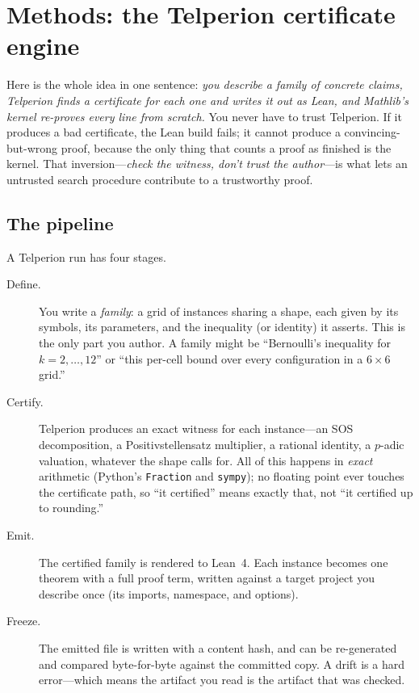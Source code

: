 \section{Methods: the Telperion certificate engine}
\label{sec:system}

Here is the whole idea in one sentence: \emph{you describe a family of concrete
claims, Telperion finds a certificate for each one and writes it out as Lean, and
Mathlib's kernel re-proves every line from scratch.} You never have to trust
Telperion. If it produces a bad certificate, the Lean build fails; it cannot
produce a convincing-but-wrong proof, because the only thing that counts a proof
as finished is the kernel. That inversion---\emph{check the witness, don't trust
the author}---is what lets an untrusted search procedure contribute to a
trustworthy proof.

\subsection{The pipeline}

A Telperion run has four stages.

\begin{description}
  \item[Define.] You write a \emph{family}: a grid of instances sharing a shape,
    each given by its symbols, its parameters, and the inequality (or identity)
    it asserts. This is the only part you author. A family might be ``Bernoulli's
    inequality for $k = 2, \dots, 12$'' or ``this per-cell bound over every
    configuration in a $6 \times 6$ grid.''
  \item[Certify.] Telperion produces an exact witness for each instance---an SOS
    decomposition, a Positivstellensatz multiplier, a rational identity, a
    $p$-adic valuation, whatever the shape calls for. All of this happens in
    \emph{exact} arithmetic (Python's \texttt{Fraction} and \texttt{sympy}); no
    floating point ever touches the certificate path, so ``it certified'' means
    exactly that, not ``it certified up to rounding.''
  \item[Emit.] The certified family is rendered to Lean~4. Each instance becomes
    one theorem with a full proof term, written against a target project you
    describe once (its imports, namespace, and options).
  \item[Freeze.] The emitted file is written with a content hash, and can be
    re-generated and compared byte-for-byte against the committed copy. A drift
    is a hard error---which means the artifact you read is the artifact that was
    checked.
\end{description}

